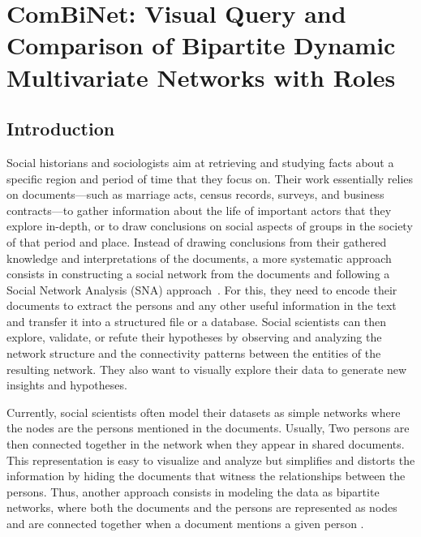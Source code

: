 \chapter{ComBiNet: Visual Query and Comparison of Bipartite Dynamic Multivariate Networks with Roles}



\section{Introduction}

Social historians and sociologists aim at retrieving and studying facts about a specific region and period of time that they focus on. Their work essentially relies on documents---such as marriage acts, census records, surveys, and business contracts---to gather information about the life of important actors that they explore in-depth, or to draw conclusions on social aspects of groups in the society of that period and place. Instead of drawing conclusions from their gathered knowledge and interpretations of the documents, a more systematic approach consists in constructing a social network from the documents and following a Social Network Analysis (SNA) approach~\cite{wetherell_historical_1998}. For this, they need to encode their documents to extract the persons and any other useful information in the text and transfer it into a structured file or a database. Social scientists can then explore, validate, or refute their hypotheses by observing and analyzing the network structure and the connectivity patterns between the entities of the resulting network. They also want to visually explore their data to generate new insights and hypotheses.

Currently, social scientists often model their datasets as simple networks where the nodes are the persons mentioned in the documents. Usually, Two persons are then connected together in the network when they appear in shared documents.
This representation is easy to visualize and analyze but simplifies and distorts the information by hiding the documents that witness the relationships between the persons. Thus, another approach consists in modeling the data as bipartite networks, where both the documents and the persons are represented as nodes and are connected together when a document mentions a given person \cite{grandjean_analisi_2017, rossi_exploration_2014, shafie_hypergraph_2017}.

